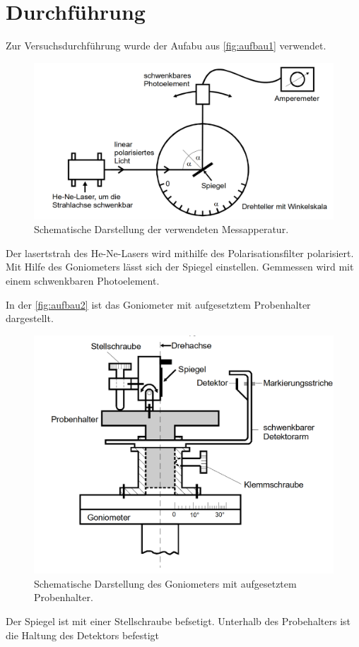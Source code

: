 \section{Durchführung}
\label{sec:durchführung}

Zur Versuchsdurchführung wurde der Aufabu aus \autoref{fig:aufbau1} verwendet.
\begin{figure}[H]
	\centering
	\includegraphics[width=0.6\linewidth]{content/grafik/aufbau1.png}
	\caption{Schematische Darstellung der verwendeten Messapperatur. \cite{fresnel}}
	\label{fig:aufbau1}
\end{figure}
Der lasertstrah des He-Ne-Lasers wird mithilfe des Polarisationsfilter polarisiert. Mit Hilfe des Goniometers lässt sich 
der Spiegel einstellen. Gemmessen wird mit einem schwenkbaren Photoelement.

In der \autoref{fig:aufbau2} ist das Goniometer mit aufgesetztem Probenhalter dargestellt.
\begin{figure}[H]
	\centering
	\includegraphics[width=0.6\linewidth]{content/grafik/aufbau2.png}
	\caption{Schematische Darstellung des Goniometers mit aufgesetztem Probenhalter. \cite{fresnel}}
	\label{fig:aufbau2}
\end{figure}
Der Spiegel ist mit einer Stellschraube befsetigt. Unterhalb des Probehalters ist die Haltung des Detektors befestigt

